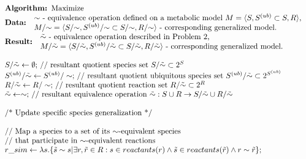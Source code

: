 \documentclass[9pt]{article}
\newcounter{def}
\begin{document}
\[ \begin{array}{l}
\mbox{\textbf{Algorithm: }Maximize}\\
\mbox{\textbf{Data: }} \begin{array}{l} \mbox{${\sim}$ - equivalence operation defined on a metabolic model $M=\langle S, S^{(ub)}\subset{S}, R \rangle$,}\\ \mbox{$M/{\sim} = \langle S/{\sim}, S^{(ub)}/{\sim} \subset S/{\sim}, R/{\sim} \rangle$ - corresponding generalized model.} 
\end{array}\\
\mbox{\textbf{Result: }} \begin{array}{l} \mbox{$\tilde{\sim}$ - equivalence operation described in Problem~2,}\\  \mbox{$M/\tilde{\sim} = \langle S/\tilde{\sim}, S^{(ub)}/\tilde{\sim} \subset S/\tilde{\sim}, R/\tilde{\sim} \rangle$ - corresponding generalized model.} \end{array}\\
\mbox{~}\\
\mbox{$S/\tilde{\sim} \leftarrow \emptyset;$ // resultant quotient species set $ S/{\tilde{\sim}}\subset 2^S$}\\
\mbox{$S^{(ub)}/\tilde{\sim} \leftarrow S^{(ub)}/\sim;$ // resultant quotient ubiquitous species set $ S^{(ub)}/{\tilde{\sim}}\subset 2^{S^{(ub)}}$}\\
\mbox{$R/\tilde{\sim} \leftarrow R/\sim;$ // resultant quotient reaction set $ R/{\tilde{\sim}}\subset 2^R$}\\
\mbox{$\tilde{\sim} \leftarrow \sim;$ // resultant equivalence operation $ {\tilde{\sim}}: S\cup{R} \rightarrow S/{\tilde{\sim}}\cup{R/{\tilde{\sim}}}$}\\
\mbox{~}\\
\mbox{/* Update specific species generalization */}\\
\mbox{~}\\
\mbox{// Map a species to a set of its $\sim$-equivalent species}\\
\mbox{// that participate in $\sim$-equivalent reactions}\\
\mbox{$r\_sim \leftarrow \lambda{s}.\{\tilde{s}\sim{s}|\exists r,\tilde{r}\in{R}: s\in reactants(r) \land \tilde{s}\in reactants(\tilde{r}) \land r \sim \tilde{r}\};$}\\

\end{array}\]
\end{document}

